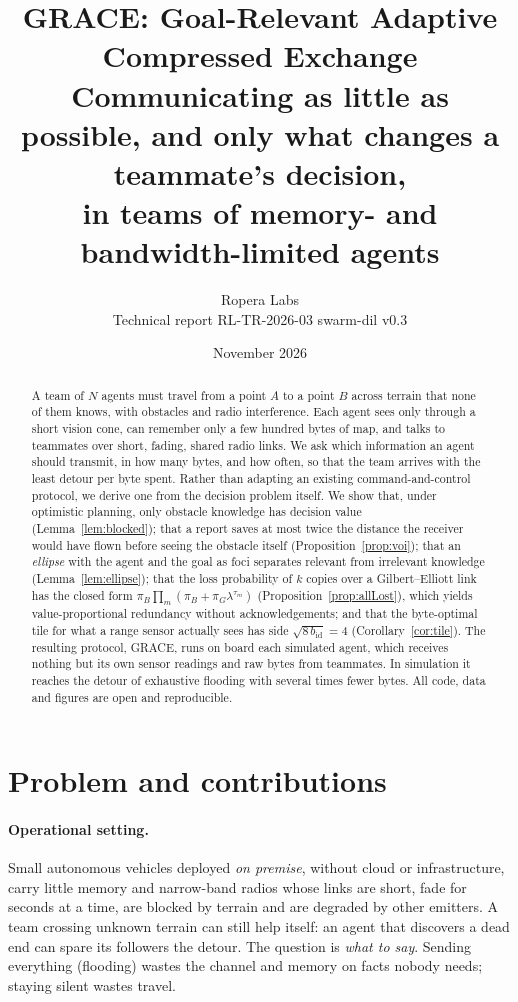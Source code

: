 \documentclass[11pt,a4paper]{article}
\title{\textbf{GRACE}: Goal-Relevant Adaptive Compressed Exchange\\[2pt]
\large Communicating as little as possible, and only what changes a teammate's decision,\\
in teams of memory- and bandwidth-limited agents}
\author{Ropera Labs\\\small Technical report RL-TR-2026-03 \textperiodcentered{} swarm-dil v0.3}
\date{November 2026}
\theoremstyle{definition}
\begin{document}
\maketitle

\begin{abstract}
A team of $N$ agents must travel from a point $A$ to a point $B$ across terrain that none of them knows, with obstacles and radio interference. Each agent sees only through a short vision cone, can remember only a few hundred bytes of map, and talks to teammates over short, fading, shared radio links. We ask which information an agent should transmit, in how many bytes, and how often, so that the team arrives with the least detour per byte spent. Rather than adapting an existing command-and-control protocol, we derive one from the decision problem itself. We show that, under optimistic planning, only obstacle knowledge has decision value (Lemma~\ref{lem:blocked}); that a report saves at most twice the distance the receiver would have flown before seeing the obstacle itself (Proposition~\ref{prop:voi}); that an \emph{ellipse} with the agent and the goal as foci separates relevant from irrelevant knowledge (Lemma~\ref{lem:ellipse}); that the loss probability of $k$ copies over a Gilbert--Elliott link has the closed form $\pi_B\prod_m(\pi_B+\pi_G\lambda^{\tau_m})$ (Proposition~\ref{prop:allLost}), which yields value-proportional redundancy without acknowledgements; and that the byte-optimal tile for what a range sensor actually sees has side $\sqrt{8\,b_{\mathrm{id}}}=4$ (Corollary~\ref{cor:tile}). The resulting protocol, GRACE, runs on board each simulated agent, which receives nothing but its own sensor readings and raw bytes from teammates. In simulation it reaches the detour of exhaustive flooding with several times fewer bytes. All code, data and figures are open and reproducible.
\end{abstract}

\section{Problem and contributions}

\paragraph{Operational setting.} Small autonomous vehicles deployed \emph{on premise}, without cloud or infrastructure, carry little memory and narrow-band radios whose links are short, fade for seconds at a time, are blocked by terrain and are degraded by other emitters. A team crossing unknown terrain can still help itself: an agent that discovers a dead end can spare its followers the detour. The question is \emph{what to say}. Sending everything (flooding) wastes the channel and memory on facts nobody needs; staying silent wastes travel.
\end{document}
